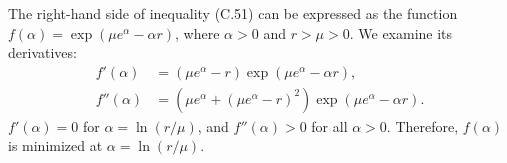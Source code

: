 \starred
The right-hand side of inequality (C.51) can be expressed as the function $f(\alpha)=\exp(\mu e^\alpha-\alpha r)$, where $\alpha>0$ and $r>\mu>0$.
We examine its derivatives:
\begin{align*}
    f'(\alpha) &= (\mu e^\alpha-r)\exp(\mu e^\alpha-\alpha r), \\
    f''(\alpha) &= \left(\mu e^\alpha+(\mu e^\alpha-r)^2\right)\exp(\mu e^\alpha-\alpha r).
\end{align*}
$f'(\alpha)=0$ for $\alpha=\ln(r/\mu)$, and $f''(\alpha)>0$ for all $\alpha>0$.
Therefore, $f(\alpha)$ is minimized at $\alpha=\ln(r/\mu)$.

